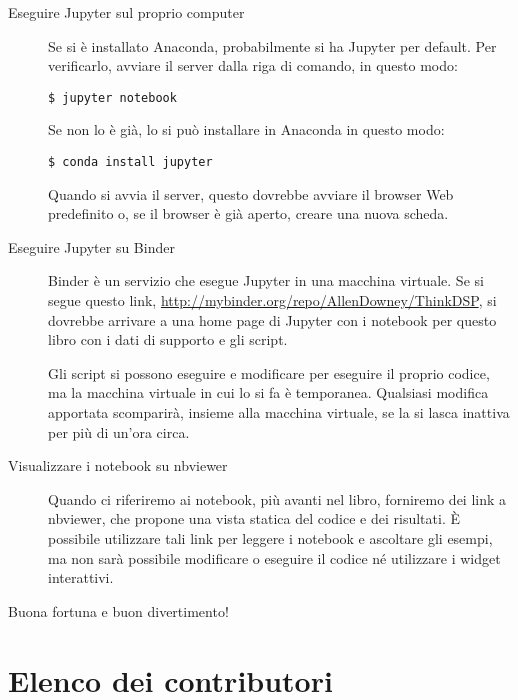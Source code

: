 \documentclass[12pt]{book} \usepackage[width=5.5in,height=8.5in, hmarginratio=3:2,vmarginratio=1:1]{geometry}
\begin{document}
\begin{description} 

\item[Eseguire Jupyter sul proprio computer]

Se si è installato Anaconda, probabilmente si ha Jupyter per default. Per verificarlo, avviare il server dalla riga di comando, in questo modo:

\begin{verbatim} 
$ jupyter notebook
 \end{verbatim} 

Se non lo è già, lo si può installare in Anaconda in questo modo:

\begin{verbatim} 
$ conda install jupyter
 \end{verbatim} 

Quando si avvia il server, questo dovrebbe avviare il browser Web predefinito o, se il browser è già aperto, creare una nuova scheda.

\item[Eseguire Jupyter su Binder]

Binder è un servizio che esegue Jupyter in una macchina virtuale. Se si segue questo link, \url{http://mybinder.org/repo/AllenDowney/ThinkDSP}, si dovrebbe arrivare a una home page di Jupyter con i notebook per questo libro con i dati di supporto e gli script.

Gli script si possono eseguire e modificare per eseguire il proprio codice, ma la macchina virtuale in cui lo si fa è temporanea. Qualsiasi modifica apportata scomparirà, insieme alla macchina virtuale, se la si lasca inattiva per più di un'ora circa.

\item[Visualizzare i notebook su nbviewer]

Quando ci riferiremo ai notebook, più avanti nel libro, forniremo dei link a nbviewer, che propone una vista statica del codice e dei risultati. È possibile utilizzare tali link per leggere i notebook e ascoltare gli esempi, ma non sarà possibile modificare o eseguire il codice né utilizzare i widget interattivi.

\end{description} 

Buona fortuna e buon divertimento!

\section*{Elenco dei contributori} 
\end{document}
